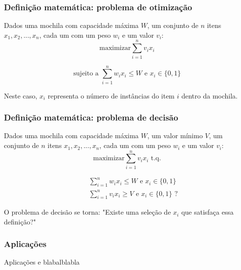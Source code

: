 \documentclass{beamer}
\begin{document}
\begin{frame}
\frametitle{Definição matemática: problema de otimização}

    Dados uma mochila com capacidade máxima $W$, um conjunto de $n$ itens $x_{1}, x_{2}, ..., x_{n}$,
    cada um com um peso $w_{i}$ e um valor $v_{i}$:\\

    \begin{equation*}
        \text{maximizar} \sum_{i=1}^{n} v_{i} x_{i}
    \end{equation*}

    \begin{equation*}
        \mbox{sujeito a } \sum_{i=1}^{n} w_{i} x_{i} \leq W \mbox{ e } x_{i} \in \{0,1\}
    \end{equation*}

    Neste caso, $x_{i}$ representa o número de instâncias do item $i$ dentro da mochila.

\end{frame}

\begin{frame}
    \frametitle{Definição matemática: problema de decisão}

    Dados uma mochila com capacidade máxima $W$, um valor mínimo $V$, um conjunto de $n$ itens $x_{1}, x_{2}, ..., x_{n}$,
    cada um com um peso $w_{i}$ e um valor $v_{i}$:\\

    \begin{equation*}
        \text{maximizar} \sum_{i=1}^{n} v_{i} x_{i} \text{ t.q.}
    \end{equation*}

    \begin{equation*}
        \begin{split}
            &\quad \sum_{i=1}^{n} w_{i} x_{i} \leq W \mbox{ e } x_{i} \in \{0,1\} \\
            &\quad \sum_{i=1}^{n} v_{i} x_{i} \geq V \mbox{ e } x_{i} \in \{0,1\} \text{ ?}
        \end{split}
    \end{equation*}

    O problema de decisão se torna: "Existe uma seleção de $x_{i}$ que satisfaça essa definição?"

\end{frame}

\begin{frame}
\frametitle{Aplicações}

Aplicações e blabalblabla

\end{frame}
\end{document}
